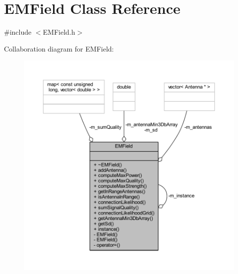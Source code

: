 \hypertarget{class_e_m_field}{}\section{E\+M\+Field Class Reference}
\label{class_e_m_field}


{\ttfamily \#include $<$E\+M\+Field.\+h$>$}



Collaboration diagram for E\+M\+Field\+:\nopagebreak
\begin{figure}[H]
\begin{center}
\leavevmode
\includegraphics[width=350pt]{class_e_m_field__coll__graph}
\end{center}
\end{figure}
